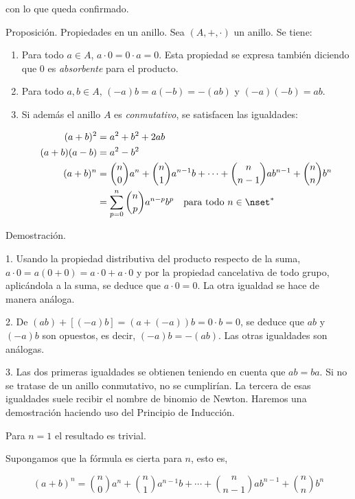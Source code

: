 \noindent con lo que queda confirmado.

Proposición. Propiedades en un anillo. Sea $(A, +, \cdot)$ un anillo. Se
tiene:

\begin{enumerate}
  \item Para todo $a \in A$, $a \cdot 0 = 0 \cdot a = 0$. Esta propiedad se
    expresa también diciendo que $0$ es \emph{absorbente} para el producto.

  \item Para todo $a, b \in A$, $({-a})b = a({-b}) = {-(ab)}$ y
    $({-a})({-b}) = ab$.

  \item Si además el anillo $A$ es \emph{conmutativo}, se satisfacen las
    igualdades:

    \begin{align*}
      (a + b)^2 &= a^2 + b^2 + 2ab \\
      (a + b)(a - b) &= a^2 - b^2 \\
      (a + b)^n &= \binom{n}{0} a^n + \binom{n}{1} a^{n-1}b + \dots +
        \binom{n}{n-1} ab^{n-1} + \binom{n}{n} b^n \\
          &= \sum_{p=0}^{n} \binom{n}{p} a^{n-p} b^p \quad \text{para todo }
          n \in \nset^*
    \end{align*}
\end{enumerate}

Demostración.

1. Usando la propiedad distributiva del producto respecto de la suma, $a
\cdot 0 = a(0 + 0) = a \cdot 0 + a \cdot 0$ y por la propiedad cancelativa
de todo grupo, aplicándola a la suma, se deduce que $a \cdot 0 = 0$. La otra
igualdad se hace de manera análoga.

2. De $(ab) + [(-a)b] = (a + (-a))b = 0 \cdot b = 0$, se deduce que $ab$ y
$(-a)b$ son opuestos, es decir, $(-a)b = -(ab)$. Las otras igualdades son
análogas.

3. Las dos primeras igualdades se obtienen teniendo en cuenta que $ab = ba$.
Si no se tratase de un anillo conmutativo, no se cumplirían. La tercera de
esas igualdades suele recibir el nombre de binomio de Newton. Haremos una
demostración haciendo uso del Principio de Inducción.

Para $n = 1$ el resultado es trivial.

Supongamos que la fórmula es cierta para $n$, esto es,

$$ (a + b)^n = \binom{n}{0} a^n + \binom{n}{1} a^{n-1}b + \cdots +
\binom{n}{n-1} ab^{n-1} + \binom{n}{n} b^n $$

